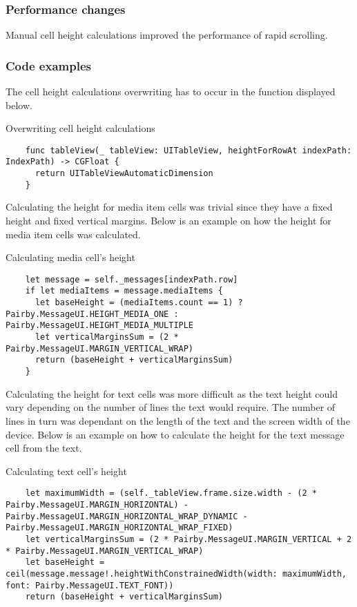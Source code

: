 \documentclass[a4paper,12pt]{article}
\begin{document}
\subsubsection*{Performance changes}
Manual cell height calculations improved the performance of rapid scrolling.


\subsubsection*{Code examples}
The cell height calculations overwriting has to occur in the function displayed below.
\begin{listing}[H]
  \caption{Overwriting cell height calculations}
  \begin{verbatim}
    func tableView(_ tableView: UITableView, heightForRowAt indexPath: IndexPath) -> CGFloat {
      return UITableViewAutomaticDimension
    }
  \end{verbatim}
\end{listing}

Calculating the height for media item cells was trivial since they have a fixed height and fixed vertical margins. Below is an example on how the height for media item cells was calculated.
\begin{listing}[H]
  \caption{Calculating media cell's height}
  \begin{verbatim}
    let message = self._messages[indexPath.row]
    if let mediaItems = message.mediaItems {
      let baseHeight = (mediaItems.count == 1) ? Pairby.MessageUI.HEIGHT_MEDIA_ONE : Pairby.MessageUI.HEIGHT_MEDIA_MULTIPLE
      let verticalMarginsSum = (2 * Pairby.MessageUI.MARGIN_VERTICAL_WRAP)
      return (baseHeight + verticalMarginsSum)
    }
  \end{verbatim}
\end{listing}

Calculating the height for text cells was more difficult as the text height could vary depending on the number of lines the text would require. The number of lines in turn was dependant on the length of the text and the screen width of the device. Below is an example on how to calculate the height for the text message cell from the text.
\begin{listing}[H]
  \caption{Calculating text cell's height}
  \begin{verbatim}
    let maximumWidth = (self._tableView.frame.size.width - (2 * Pairby.MessageUI.MARGIN_HORIZONTAL) - Pairby.MessageUI.MARGIN_HORIZONTAL_WRAP_DYNAMIC - Pairby.MessageUI.MARGIN_HORIZONTAL_WRAP_FIXED)
    let verticalMarginsSum = (2 * Pairby.MessageUI.MARGIN_VERTICAL + 2 * Pairby.MessageUI.MARGIN_VERTICAL_WRAP)
    let baseHeight = ceil(message.message!.heightWithConstrainedWidth(width: maximumWidth, font: Pairby.MessageUI.TEXT_FONT))
    return (baseHeight + verticalMarginsSum)
  \end{verbatim}
\end{listing}
\end{document}
